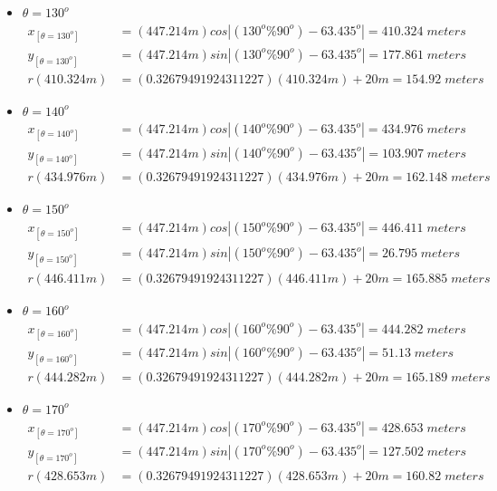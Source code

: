 \begin{itemize}
\item $\theta=130^o$
	\begin{align*}%
		x_{[\theta=130^o]} &=(447.214m) cos\left| (130^o\%90^o) - 63.435^o \right|  =410.324\;meters \\
		y_{[\theta=130^o]} &=(447.214m) sin\left| (130^o\%90^o) - 63.435^o \right|  =177.861\;meters \\
		r(410.324m) &=(0.32679491924311227)(410.324m)+20m  =154.92\;meters\end{align*}
\item $\theta=140^o$
	\begin{align*}%
		x_{[\theta=140^o]} &=(447.214m) cos\left| (140^o\%90^o) - 63.435^o \right|  =434.976\;meters \\
		y_{[\theta=140^o]} &=(447.214m) sin\left| (140^o\%90^o) - 63.435^o \right|  =103.907\;meters \\
		r(434.976m) &=(0.32679491924311227)(434.976m)+20m  =162.148\;meters\end{align*}
\item $\theta=150^o$
	\begin{align*}%
		x_{[\theta=150^o]} &=(447.214m) cos\left| (150^o\%90^o) - 63.435^o \right|  =446.411\;meters \\
		y_{[\theta=150^o]} &=(447.214m) sin\left| (150^o\%90^o) - 63.435^o \right|  =26.795\;meters \\
		r(446.411m) &=(0.32679491924311227)(446.411m)+20m  =165.885\;meters\end{align*}
\item $\theta=160^o$
	\begin{align*}%
		x_{[\theta=160^o]} &=(447.214m) cos\left| (160^o\%90^o) - 63.435^o \right|  =444.282\;meters \\
		y_{[\theta=160^o]} &=(447.214m) sin\left| (160^o\%90^o) - 63.435^o \right|  =51.13\;meters \\
		r(444.282m) &=(0.32679491924311227)(444.282m)+20m  =165.189\;meters\end{align*}
\item $\theta=170^o$
	\begin{align*}%
		x_{[\theta=170^o]} &=(447.214m) cos\left| (170^o\%90^o) - 63.435^o \right|  =428.653\;meters \\
		y_{[\theta=170^o]} &=(447.214m) sin\left| (170^o\%90^o) - 63.435^o \right|  =127.502\;meters \\
		r(428.653m) &=(0.32679491924311227)(428.653m)+20m  =160.82\;meters\end{align*}
    \end{itemize}

